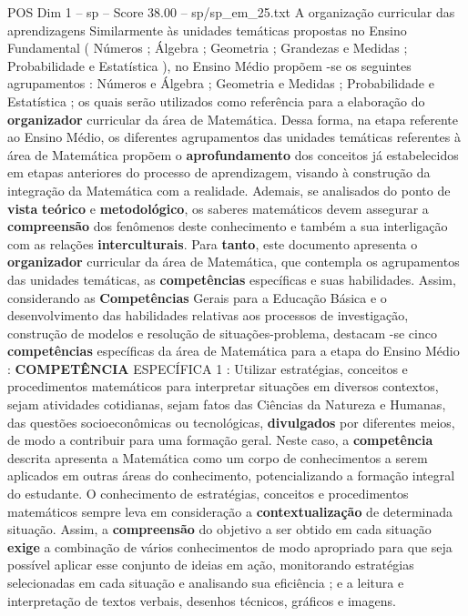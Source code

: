 \begin{textsample}{POS Dim 1 – sp – Score 38.00 – sp/sp\_em\_25.txt}  \label{ex:f1_pos_119}
A organização curricular das aprendizagens Similarmente às unidades temáticas propostas no Ensino Fundamental ( Números ; Álgebra ; Geometria ; Grandezas e Medidas ; Probabilidade e Estatística ), no Ensino Médio propõem -se os seguintes agrupamentos : Números e Álgebra ; Geometria e Medidas ; Probabilidade e Estatística ; os quais serão utilizados como referência para a elaboração do \textbf{organizador} curricular da área de Matemática.
Dessa forma, na etapa referente ao Ensino Médio, os diferentes agrupamentos das unidades temáticas referentes à área de Matemática propõem o \textbf{aprofundamento} dos conceitos já estabelecidos em etapas anteriores do processo de aprendizagem, visando à construção da integração da Matemática com a realidade.
Ademais, se analisados do ponto de \textbf{vista} \textbf{teórico} e \textbf{metodológico}, os saberes matemáticos devem assegurar a \textbf{compreensão} dos fenômenos deste conhecimento e também a sua interligação com as relações \textbf{interculturais}.
Para \textbf{tanto}, este documento apresenta o \textbf{organizador} curricular da área de Matemática, que contempla os agrupamentos das unidades temáticas, as \textbf{competências} específicas e suas habilidades.
Assim, considerando as \textbf{Competências} Gerais para a Educação Básica e o desenvolvimento das habilidades relativas aos processos de investigação, construção de modelos e resolução de situações-problema, destacam -se cinco \textbf{competências} específicas da área de Matemática para a etapa do Ensino Médio : \textbf{COMPETÊNCIA} ESPECÍFICA 1 : Utilizar estratégias, conceitos e procedimentos matemáticos para interpretar situações em diversos contextos, sejam atividades cotidianas, sejam fatos das Ciências da Natureza e Humanas, das questões socioeconômicas ou tecnológicas, \textbf{divulgados} por diferentes meios, de modo a contribuir para uma formação geral.
Neste caso, a \textbf{competência} descrita apresenta a Matemática como um corpo de conhecimentos a serem aplicados em outras áreas do conhecimento, potencializando a formação integral do estudante.
O conhecimento de estratégias, conceitos e procedimentos matemáticos sempre leva em consideração a \textbf{contextualização} de determinada situação.
Assim, a \textbf{compreensão} do objetivo a ser obtido em cada situação \textbf{exige} a combinação de vários conhecimentos de modo apropriado para que seja possível aplicar esse conjunto de ideias em ação, monitorando estratégias selecionadas em cada situação e analisando sua eficiência ; e a leitura e interpretação de textos verbais, desenhos técnicos, gráficos e imagens.

\end{textsample}
